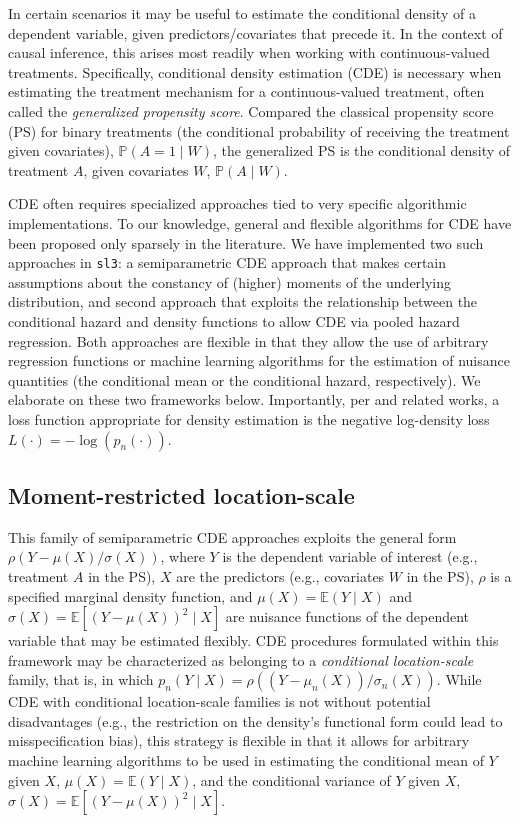 \documentclass[
  12pt, krantz2,
]{krantz}
\newcommand{\passthrough}[1]{#1}
\newcommand{\E}{\mathbb{E}}
\newcommand{\1}{\mathbbm{1}}
\theoremstyle{definition}
\theoremstyle{definition}
\theoremstyle{definition}
\theoremstyle{definition}
\theoremstyle{remark}
\begin{document}
In certain scenarios it may be useful to estimate the conditional density of a
dependent variable, given predictors/covariates that precede it. In the context
of causal inference, this arises most readily when working with
continuous-valued treatments. Specifically, conditional density estimation (CDE)
is necessary when estimating the treatment mechanism for a continuous-valued
treatment, often called the \emph{generalized propensity score}. Compared the
classical propensity score (PS) for binary treatments (the conditional
probability of receiving the treatment given covariates), \(\mathbb{P}(A = 1 \mid W)\), the generalized PS is the conditional density of treatment \(A\), given
covariates \(W\), \(\mathbb{P}(A \mid W)\).

CDE often requires specialized approaches tied to very specific algorithmic
implementations. To our knowledge, general and flexible algorithms for CDE have
been proposed only sparsely in the literature. We have implemented two such
approaches in \passthrough{\lstinline!sl3!}: a semiparametric CDE approach that makes certain
assumptions about the constancy of (higher) moments of the underlying
distribution, and second approach that exploits the relationship between the
conditional hazard and density functions to allow CDE via pooled hazard
regression. Both approaches are flexible in that they allow the use of arbitrary
regression functions or machine learning algorithms for the estimation of
nuisance quantities (the conditional mean or the conditional hazard,
respectively). We elaborate on these two frameworks below. Importantly, per
\citet{dudoit2005asymptotics} and related works, a loss function appropriate for
density estimation is the negative log-density loss \(L(\cdot) = -\log(p_n(\cdot))\).

\hypertarget{moment-restricted-location-scale}{%
\subsection{Moment-restricted location-scale}\label{moment-restricted-location-scale}}

This family of semiparametric CDE approaches exploits the general form \(\rho(Y - \mu(X) / \sigma(X))\), where \(Y\) is the dependent variable of interest (e.g.,
treatment \(A\) in the PS), \(X\) are the predictors (e.g., covariates \(W\) in the
PS), \(\rho\) is a specified marginal density function, and \(\mu(X) = \E(Y \mid X)\) and \(\sigma(X) = \E[(Y - \mu(X))^2 \mid X]\) are nuisance functions of the
dependent variable that may be estimated flexibly. CDE procedures formulated
within this framework may be characterized as belonging to a \emph{conditional
location-scale} family, that is, in which \(p_n(Y \mid X) = \rho((Y - \mu_n(X)) / \sigma_n(X))\). While CDE with conditional location-scale families is not without
potential disadvantages (e.g., the restriction on the density's functional form
could lead to misspecification bias), this strategy is flexible in that it
allows for arbitrary machine learning algorithms to be used in estimating the
conditional mean of \(Y\) given \(X\), \(\mu(X) = \E(Y \mid X)\), and the conditional
variance of \(Y\) given \(X\), \(\sigma(X) = \E[(Y - \mu(X))^2 \mid X]\).
\end{document}
